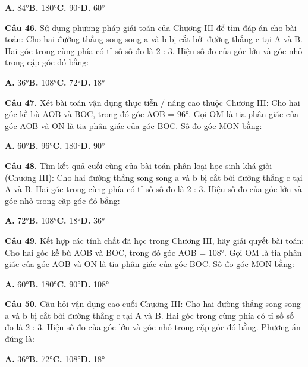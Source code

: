 \documentclass[11pt,a4paper]{article}
\begin{document}
\hspace*{1.5em}\textbf{A.} 84°\quad\quad \textbf{B.} 180°\quad\quad \textbf{C.} 90°\quad\quad \textbf{D.} 60°\par\vspace{2pt}
\textbf{\color{primary} Câu 46.} Sử dụng phương pháp giải toán của Chương III để tìm đáp án cho bài toán: Cho hai đường thẳng song song a và b bị cắt bởi đường thẳng c tại A và B. Hai góc trong cùng phía có tỉ số số đo là 2 : 3. Hiệu số đo của góc lớn và góc nhỏ trong cặp góc đó bằng:\par
\hspace*{1.5em}\textbf{A.} 36°\quad\quad \textbf{B.} 108°\quad\quad \textbf{C.} 72°\quad\quad \textbf{D.} 18°\par\vspace{2pt}
\textbf{\color{primary} Câu 47.} Xét bài toán vận dụng thực tiễn / nâng cao thuộc Chương III: Cho hai góc kề bù AOB và BOC, trong đó góc AOB = 96°. Gọi OM là tia phân giác của góc AOB và ON là tia phân giác của góc BOC. Số đo góc MON bằng:\par
\hspace*{1.5em}\textbf{A.} 60°\quad\quad \textbf{B.} 96°\quad\quad \textbf{C.} 180°\quad\quad \textbf{D.} 90°\par\vspace{2pt}
\textbf{\color{primary} Câu 48.} Tìm kết quả cuối cùng của bài toán phân loại học sinh khá giỏi (Chương III): Cho hai đường thẳng song song a và b bị cắt bởi đường thẳng c tại A và B. Hai góc trong cùng phía có tỉ số số đo là 2 : 3. Hiệu số đo của góc lớn và góc nhỏ trong cặp góc đó bằng:\par
\hspace*{1.5em}\textbf{A.} 72°\quad\quad \textbf{B.} 108°\quad\quad \textbf{C.} 18°\quad\quad \textbf{D.} 36°\par\vspace{2pt}
\textbf{\color{primary} Câu 49.} Kết hợp các tính chất đã học trong Chương III, hãy giải quyết bài toán: Cho hai góc kề bù AOB và BOC, trong đó góc AOB = 108°. Gọi OM là tia phân giác của góc AOB và ON là tia phân giác của góc BOC. Số đo góc MON bằng:\par
\hspace*{1.5em}\textbf{A.} 60°\quad\quad \textbf{B.} 180°\quad\quad \textbf{C.} 90°\quad\quad \textbf{D.} 108°\par\vspace{2pt}
\textbf{\color{primary} Câu 50.} Câu hỏi vận dụng cao cuối Chương III: Cho hai đường thẳng song song a và b bị cắt bởi đường thẳng c tại A và B. Hai góc trong cùng phía có tỉ số số đo là 2 : 3. Hiệu số đo của góc lớn và góc nhỏ trong cặp góc đó bằng. Phương án đúng là:\par
\hspace*{1.5em}\textbf{A.} 36°\quad\quad \textbf{B.} 72°\quad\quad \textbf{C.} 108°\quad\quad \textbf{D.} 18°\par\vspace{2pt}
\end{document}
